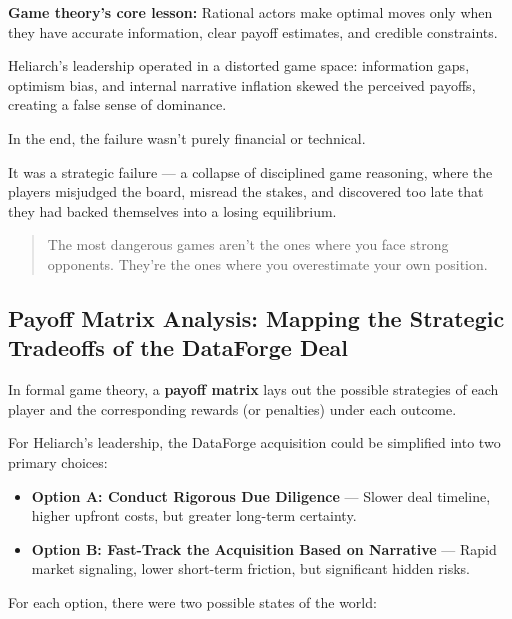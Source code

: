 \medskip

\textbf{Game theory’s core lesson:}  
Rational actors make optimal moves only when they have accurate information, clear payoff estimates, and credible constraints.

\medskip

Heliarch’s leadership operated in a distorted game space:  
information gaps, optimism bias, and internal narrative inflation skewed the perceived payoffs, creating a false sense of dominance.

\medskip

In the end, the failure wasn’t purely financial or technical.

It was a strategic failure —  
a collapse of disciplined game reasoning,  
where the players misjudged the board, misread the stakes,  
and discovered too late that they had backed themselves into a losing equilibrium.

\begin{quote}
    The most dangerous games aren’t the ones where you face strong opponents.  
    They’re the ones where you overestimate your own position.
\end{quote}


\subsection{Payoff Matrix Analysis: Mapping the Strategic Tradeoffs of the DataForge Deal}

In formal game theory, a \textbf{payoff matrix} lays out the possible strategies of each player and the corresponding rewards (or penalties) under each outcome.

\medskip

For Heliarch’s leadership, the DataForge acquisition could be simplified into two primary choices:

\begin{itemize}
    \item \textbf{Option A: Conduct Rigorous Due Diligence}  
    — Slower deal timeline, higher upfront costs, but greater long-term certainty.
    
    \item \textbf{Option B: Fast-Track the Acquisition Based on Narrative}  
    — Rapid market signaling, lower short-term friction, but significant hidden risks.
\end{itemize}

\medskip

For each option, there were two possible states of the world:

